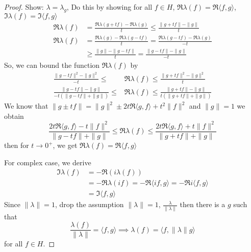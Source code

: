 \begin{proof}
  Show: $\lambda = \lambda_g$, Do this by showing for all $f \in H$, $\Re \lambda(f) = \Re \langle f, g\rangle$, $\Im \lambda(f) = \Im \langle f, g\rangle$
  \begin{align*}
    \Re \lambda(f) &= \frac{\Re \lambda(g + tf) - \Re \lambda(g)}{t} \le \frac{\|g + tf\| - \|g\|}t\\
    \Re \lambda(f) &= \frac{\Re \lambda(g) - \Re \lambda(g-tf)}{t} = \frac{\Re\lambda(g-tf) - \Re\lambda(g)}{-t} \\
    &\ge \frac{\|g\| - \|g-tf\|}{t} = \frac{\|g -tf\| - \|g\|}{-t}
  \end{align*}
  So, we can bound the function $\Re \lambda(f)$ by
  \begin{align*}
    \frac{\|g -tf\|^2 - \|g\|^2}{-t} \le &\Re \lambda(f) \le \frac{\|g + tf\|^2 - \|g\|^2}t \\
    \frac{\|g -tf\| - \|g\|}{-t(\|g -tf\| + \|g\|)} \le &\Re \lambda(f) \le \frac{\|g + tf\| - \|g\|}{t(\|g +tf\| + \|g\|)} 
  \end{align*}
  We know that $\|g \pm tf\| = \|g\|^2 \pm 2t\Re\langle g, f\rangle + t^2\|f\|^2$ and $\|g\| = 1$ we obtain
  \[
    \frac{2t \Re \langle g, f\rangle - t\|f\|^2}{\|g -tf\| + \|g\|} \le \Re \lambda(f) \le \frac{2t \Re \langle g, f\rangle + t\|f\|^2}{\|g +tf\| + \|g\|}
  \]
  then for $t \to 0^+$, we get $\Re \lambda(f) = \Re \langle f, g\rangle$

  
  For complex case, we derive
  \begin{align*}
    \Im \lambda(f) &= -\Re(i\lambda(f)) \\
    &= -\Re\lambda(if) = -\Re\langle if, g\rangle = -\Re i\langle f, g\rangle \\
    &= \Im \langle f, g\rangle
  \end{align*}
  Since $\|\lambda\| = 1$, drop the assumption $\|\lambda\| =1$,
  $\frac{\lambda}{\|\lambda\|}$ then there is a $g$ such that
  \[\frac{\lambda(f)}{\|\lambda\|} = \langle f,g\rangle \implies \lambda(f) = \langle f, \|\lambda\|g\rangle\]
  for all $f \in H$.
\end{proof}